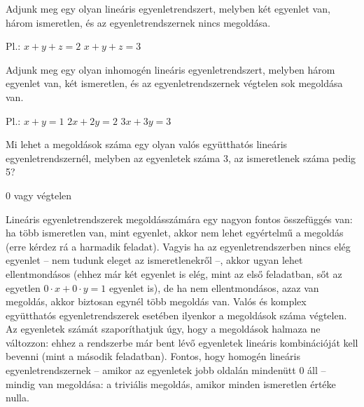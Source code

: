 \begin{frame}
  \begin{tcolorbox}[title={5/1. -N-}]
      Adjunk meg egy olyan lineáris egyenletrendszert, melyben két egyenlet van, három ismeretlen, és az egyenletrendszernek nincs megoldása.
  \tcblower

    \mmedskip 
    
    Pl.:
$x + y + z = 2$
$x + y + z = 3$
  \end{tcolorbox}
\end{frame}


\begin{frame}
  \begin{tcolorbox}[title={5/2. -N-}]
      Adjunk meg egy olyan inhomogén lineáris egyenletrendszert, melyben három egyenlet van, két ismeretlen, és az egyenletrendszernek végtelen sok megoldása van.
  \tcblower

    \mmedskip 
    
    Pl.:
$x + y = 1$
$2x + 2y = 2$
$3x + 3y = 3$

  \end{tcolorbox}
\end{frame}


\begin{frame}
  \begin{tcolorbox}[title={5/3. -N-}]
      Mi lehet a megoldások száma egy olyan valós együtthatós lineáris egyenletrendszernél, melyben az egyenletek száma 3, az ismeretlenek száma pedig 5?
  \tcblower

    \mmedskip 
    
    0 vagy végtelen
  \end{tcolorbox}
\end{frame}


\begin{frame}
  \begin{tcolorbox}[title={5/3. -N-}]
Lineáris egyenletrendszerek megoldásszámára egy nagyon fontos összefüggés van: ha több ismeretlen van, mint egyenlet, akkor nem lehet egyértelmű a megoldás (erre kérdez rá a harmadik feladat). Vagyis ha az egyenletrendszerben nincs elég egyenlet – nem tudunk eleget az ismeretlenekről –, akkor ugyan lehet ellentmondásos (ehhez már két egyenlet is elég, mint az első feladatban, sőt az egyetlen $0 \cdot x + 0 \cdot y = 1$ egyenlet is), de ha nem ellentmondásos, azaz van megoldás, akkor biztosan egynél több megoldás van. Valós és komplex együtthatós egyenletrendszerek esetében ilyenkor a megoldások száma végtelen. Az egyenletek számát szaporíthatjuk úgy, hogy a megoldások halmaza ne változzon: ehhez a rendszerbe már bent lévő egyenletek lineáris kombinációját kell bevenni (mint a második feladatban). Fontos, hogy homogén lineáris egyenletrendszernek – amikor az egyenletek jobb oldalán mindenütt 0 áll – mindig van megoldása: a triviális megoldás, amikor minden ismeretlen értéke nulla.
  \end{tcolorbox}
\end{frame}



